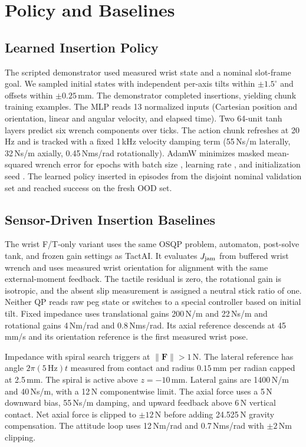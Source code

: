 \documentclass[letterpaper,10pt,conference]{IEEEtran}
\begin{document}
\section{Policy and Baselines}
\label{app:policy}

\subsection{Learned Insertion Policy}
The scripted demonstrator used measured wrist state and a nominal slot-frame goal. We sampled \DemoCount{} initial states with independent per-axis tilts within $\pm1.5^\circ$ and offsets within $\pm0.25$\,mm. The demonstrator completed \DemoSuccesses{} insertions, yielding \TrainExamples{} chunk training examples. The MLP reads 13 normalized inputs (Cartesian position and orientation, linear and angular velocity, and elapsed time). Two 64-unit tanh layers predict six wrench components over \ChunkHorizon{} ticks. The action chunk refreshes at 20\,Hz and is tracked with a fixed 1\,kHz velocity damping term (55\,Ns/m laterally, 32\,Ns/m axially, 0.45\,Nms/rad rotationally). AdamW minimizes masked mean-squared wrench error for \TrainEpochs{} epochs with batch size \TrainBatch{}, learning rate \TrainLR{}, and initialization seed \TrainSeed{}. The learned policy inserted in \NominalSuccess{} episodes from the disjoint nominal validation set and reached \UnconstrainedSuccess{} success on the fresh OOD set.

\subsection{Sensor-Driven Insertion Baselines}
The wrist F/T-only variant uses the same OSQP problem, automaton, post-solve tank, and frozen gain settings as TactAI. It evaluates $J_{\rm jam}$ from buffered wrist wrench and uses measured wrist orientation for alignment with the same external-moment feedback. The tactile residual is zero, the rotational gain is isotropic, and the absent slip measurement is assigned a neutral stick ratio of one. Neither QP reads raw peg state or switches to a special controller based on initial tilt. Fixed impedance uses translational gains 200\,N/m and 22\,Ns/m and rotational gains 4\,Nm/rad and 0.8\,Nms/rad. Its axial reference descends at 45\,mm/s and its orientation reference is the first measured wrist pose.

Impedance with spiral search triggers at $\|\mathbf F\|>1$\,N. The lateral reference has angle $2\pi(5\,\mathrm{Hz})t$ measured from contact and radius $0.15$\,mm per radian capped at 2.5\,mm. The spiral is active above $z=-10$\,mm. Lateral gains are 1400\,N/m and 40\,Ns/m, with a 12\,N componentwise limit. The axial force uses a 5\,N downward bias, 55\,Ns/m damping, and upward feedback above 6\,N vertical contact. Net axial force is clipped to $\pm12$\,N before adding 24.525\,N gravity compensation. The attitude loop uses 12\,Nm/rad and 0.7\,Nms/rad with $\pm2$\,Nm clipping.
\end{document}
